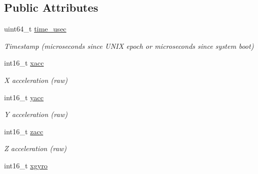 \subsection*{Public Attributes}
\begin{DoxyCompactItemize}
\item 
\hypertarget{struct____mavlink__raw__imu__t_a571520057ab2c9fa547fca7755099dfc}{uint64\+\_\+t \hyperlink{struct____mavlink__raw__imu__t_a571520057ab2c9fa547fca7755099dfc}{time\+\_\+usec}}\label{struct____mavlink__raw__imu__t_a571520057ab2c9fa547fca7755099dfc}

\begin{DoxyCompactList}\small\item\em Timestamp (microseconds since U\+N\+I\+X epoch or microseconds since system boot) \end{DoxyCompactList}\item 
\hypertarget{struct____mavlink__raw__imu__t_ade9a866890ed99f81ce8bd7dbef2c920}{int16\+\_\+t \hyperlink{struct____mavlink__raw__imu__t_ade9a866890ed99f81ce8bd7dbef2c920}{xacc}}\label{struct____mavlink__raw__imu__t_ade9a866890ed99f81ce8bd7dbef2c920}

\begin{DoxyCompactList}\small\item\em X acceleration (raw) \end{DoxyCompactList}\item 
\hypertarget{struct____mavlink__raw__imu__t_a5080c838e03f9ed2237fffbfd26ff1a3}{int16\+\_\+t \hyperlink{struct____mavlink__raw__imu__t_a5080c838e03f9ed2237fffbfd26ff1a3}{yacc}}\label{struct____mavlink__raw__imu__t_a5080c838e03f9ed2237fffbfd26ff1a3}

\begin{DoxyCompactList}\small\item\em Y acceleration (raw) \end{DoxyCompactList}\item 
\hypertarget{struct____mavlink__raw__imu__t_a0c71dfe587d17f471e59ed5acd5691f8}{int16\+\_\+t \hyperlink{struct____mavlink__raw__imu__t_a0c71dfe587d17f471e59ed5acd5691f8}{zacc}}\label{struct____mavlink__raw__imu__t_a0c71dfe587d17f471e59ed5acd5691f8}

\begin{DoxyCompactList}\small\item\em Z acceleration (raw) \end{DoxyCompactList}\item 
\hypertarget{struct____mavlink__raw__imu__t_ad1b8a0589cf0a476cb04629dcb60bbe9}{int16\+\_\+t \hyperlink{struct____mavlink__raw__imu__t_ad1b8a0589cf0a476cb04629dcb60bbe9}{xgyro}}\label{struct____mavlink__raw__imu__t_ad1b8a0589cf0a476cb04629dcb60bbe9}


\end{DoxyCompactItemize}

